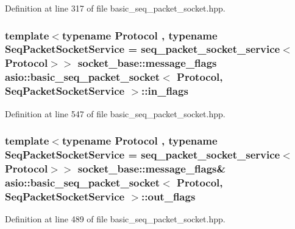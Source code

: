 Definition at line 317 of file basic\+\_\+seq\+\_\+packet\+\_\+socket.\+hpp.

\hypertarget{classasio_1_1basic__seq__packet__socket_aabcc430c9e81052d026b2994274c0fd1}{}
\subsubsection[{in\+\_\+flags}]{\setlength{\rightskip}{0pt plus 5cm}template$<$typename Protocol , typename Seq\+Packet\+Socket\+Service  = seq\+\_\+packet\+\_\+socket\+\_\+service$<$\+Protocol$>$$>$ {\bf socket\+\_\+base\+::message\+\_\+flags} {\bf asio\+::basic\+\_\+seq\+\_\+packet\+\_\+socket}$<$ Protocol, Seq\+Packet\+Socket\+Service $>$\+::in\+\_\+flags}\label{classasio_1_1basic__seq__packet__socket_aabcc430c9e81052d026b2994274c0fd1}


Definition at line 547 of file basic\+\_\+seq\+\_\+packet\+\_\+socket.\+hpp.

\hypertarget{classasio_1_1basic__seq__packet__socket_a8e5185dc6014d8e5f9e91ab7743ace7c}{}
\subsubsection[{out\+\_\+flags}]{\setlength{\rightskip}{0pt plus 5cm}template$<$typename Protocol , typename Seq\+Packet\+Socket\+Service  = seq\+\_\+packet\+\_\+socket\+\_\+service$<$\+Protocol$>$$>$ {\bf socket\+\_\+base\+::message\+\_\+flags}\& {\bf asio\+::basic\+\_\+seq\+\_\+packet\+\_\+socket}$<$ Protocol, Seq\+Packet\+Socket\+Service $>$\+::out\+\_\+flags}\label{classasio_1_1basic__seq__packet__socket_a8e5185dc6014d8e5f9e91ab7743ace7c}


Definition at line 489 of file basic\+\_\+seq\+\_\+packet\+\_\+socket.\+hpp.

\hypertarget{classasio_1_1basic__seq__packet__socket_a63081bd10275f42753f357545f4958b8}{}
